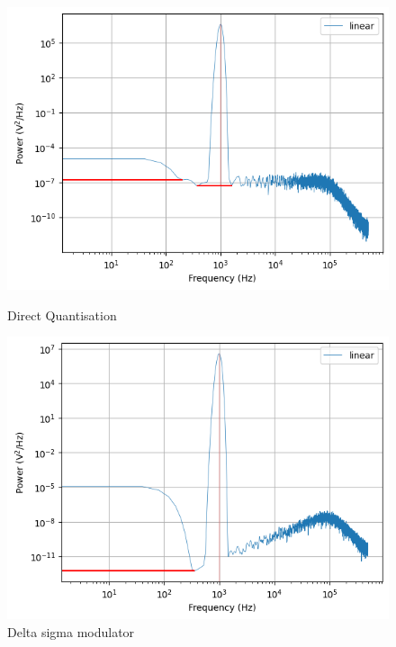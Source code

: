 \documentclass[a4paper]{article}
\begin{document}
\begin{figure}[!h]
	\centering
	\begin{minipage}{0.45\linewidth}
		\centering
		\includegraphics[scale = 0.58]{psd_plots/direct.png}
		\caption{Direct Quantisation}
        \label{fig:direct_psd}
	\end{minipage}
	\hfil
	\begin{minipage}{0.45\linewidth}
		\centering
		\includegraphics[scale = 0.6]{psd_plots/dsm.png}
		\caption{Delta sigma modulator}
   \label{fig:dsm_psd}
	\end{minipage}
\end{figure}
\end{document}
